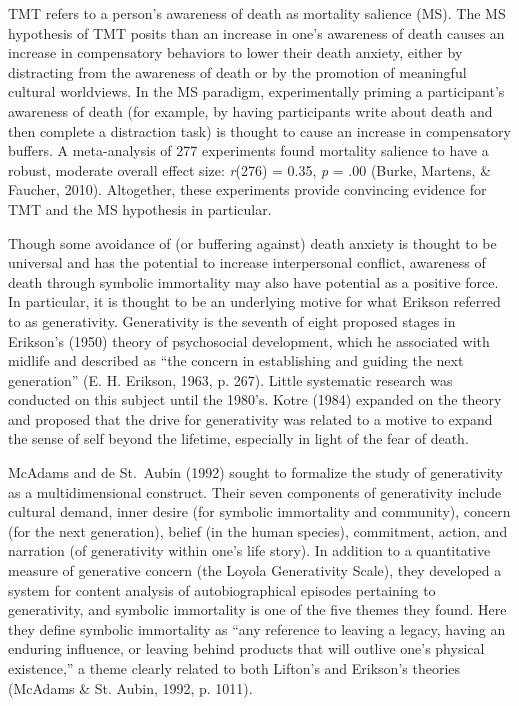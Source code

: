 \documentclass[
  man]{apa6}
\begin{document}
TMT refers to a person's awareness of death as mortality salience (MS).
The MS hypothesis of TMT posits than an increase in one's awareness of
death causes an increase in compensatory behaviors to lower their death
anxiety, either by distracting from the awareness of death or by the
promotion of meaningful cultural worldviews. In the MS paradigm,
experimentally priming a participant's awareness of death (for example,
by having participants write about death and then complete a distraction
task) is thought to cause an increase in compensatory buffers. A
meta-analysis of 277 experiments found mortality salience to have a
robust, moderate overall effect size: \emph{r}(276) = 0.35, \emph{p} = .00
(Burke, Martens, \& Faucher, 2010). Altogether, these experiments provide convincing evidence
for TMT and the MS hypothesis in particular.

Though some avoidance of (or buffering against) death anxiety is thought
to be universal and has the potential to increase interpersonal
conflict, awareness of death through symbolic immortality may also have
potential as a positive force. In particular, it is thought to be an
underlying motive for what Erikson referred to as generativity.
Generativity is the seventh of eight proposed stages in Erikson's
(1950) theory of psychosocial development, which he associated
with midlife and described as ``the concern in establishing and guiding
the next generation'' (E. H. Erikson, 1963, p. 267). Little systematic research
was conducted on this subject until the 1980's. Kotre (1984)
expanded on the theory and proposed that the drive for generativity was
related to a motive to expand the sense of self beyond the lifetime,
especially in light of the fear of death.

McAdams and de St.~Aubin (1992) sought to formalize the study
of generativity as a multidimensional construct. Their seven components
of generativity include cultural demand, inner desire (for symbolic
immortality and community), concern (for the next generation), belief
(in the human species), commitment, action, and narration (of
generativity within one's life story). In addition to a quantitative
measure of generative concern (the Loyola Generativity Scale), they
developed a system for content analysis of autobiographical episodes
pertaining to generativity, and symbolic immortality is one of the five
themes they found. Here they define symbolic immortality as ``any
reference to leaving a legacy, having an enduring influence, or leaving
behind products that will outlive one's physical existence,'' a theme
clearly related to both Lifton's and Erikson's theories (McAdams \& St. Aubin, 1992, p. 1011).
\end{document}

